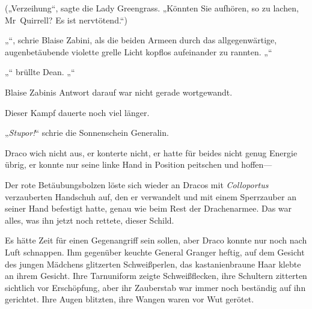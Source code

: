 („Verzeihung“, sagte die Lady Greengrass. „Könnten Sie aufhören, so zu lachen, Mr~Quirrell? Es ist nervtötend.“)

„“, schrie Blaise Zabini, als die beiden Armeen durch das allgegenwärtige, augenbetäubende violette grelle Licht kopflos aufeinander zu rannten. „“

„“ brüllte Dean. „“

Blaise Zabinis Antwort darauf war nicht gerade wortgewandt.

Dieser Kampf dauerte noch viel länger.

\later

„\emph{Stupor!}“ schrie die Sonnenschein Generalin.

Draco wich nicht aus, er konterte nicht, er hatte für beides nicht genug Energie übrig, er konnte nur seine linke Hand in Position peitschen und hoffen—

Der rote Betäubungsbolzen löste sich wieder an Dracos mit \emph{Colloportus} verzauberten Handschuh auf, den er verwandelt und mit einem Sperrzauber an seiner Hand befestigt hatte, genau wie beim Rest der Drachenarmee. Das war alles, was ihn jetzt noch rettete, dieser Schild.

Es hätte Zeit für einen Gegenangriff sein sollen, aber Draco konnte nur noch nach Luft schnappen. Ihm gegenüber keuchte General Granger heftig, auf dem Gesicht des jungen Mädchens glitzerten Schweißperlen, das kastanienbraune Haar klebte an ihrem Gesicht. Ihre Tarnuniform zeigte Schweißflecken, ihre Schultern zitterten sichtlich vor Erschöpfung, aber ihr Zauberstab war immer noch beständig auf ihn gerichtet. Ihre Augen blitzten, ihre Wangen waren vor Wut gerötet.

